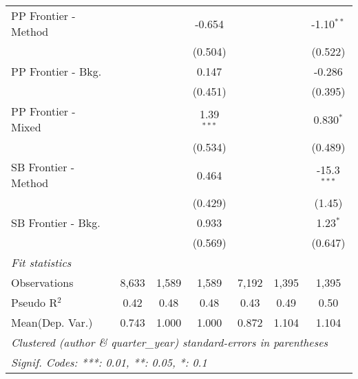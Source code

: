 \begin{tabular}{lcccccc}
   PP Frontier - Method &         &             & -0.654       &         &         & -1.10$^{**}$\\   
                        &         &             & (0.504)      &         &         & (0.522)\\   
   PP Frontier - Bkg.   &         &             & 0.147        &         &         & -0.286\\   
                        &         &             & (0.451)      &         &         & (0.395)\\   
   PP Frontier - Mixed  &         &             & 1.39$^{***}$ &         &         & 0.830$^{*}$\\   
                        &         &             & (0.534)      &         &         & (0.489)\\   
   SB Frontier - Method &         &             & 0.464        &         &         & -15.3$^{***}$\\   
                        &         &             & (0.429)      &         &         & (1.45)\\   
   SB Frontier - Bkg.   &         &             & 0.933        &         &         & 1.23$^{*}$\\   
                        &         &             & (0.569)      &         &         & (0.647)\\   
   \midrule
   \emph{Fit statistics}\\
   Observations         & 8,633   & 1,589       & 1,589        & 7,192   & 1,395   & 1,395\\  
   Pseudo R$^2$         & 0.42    & 0.48        & 0.48         & 0.43    & 0.49    & 0.50\\  
Mean(Dep. Var.) & 0.743 & 1.000 & 1.000 & 0.872 & 1.104 & 1.104 \\
   \midrule \midrule
   \multicolumn{7}{l}{\emph{Clustered (author \& quarter\_year) standard-errors in parentheses}}\\
   \multicolumn{7}{l}{\emph{Signif. Codes: ***: 0.01, **: 0.05, *: 0.1}}\\
\end{tabular}
\par\endgroup
